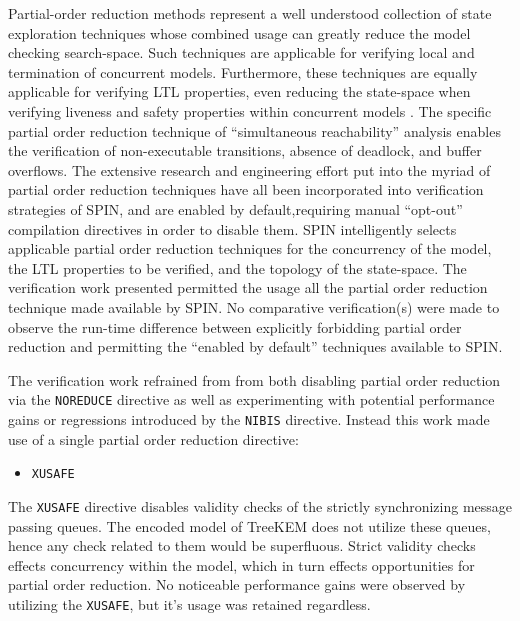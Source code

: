 Partial-order reduction methods represent a well understood collection of state exploration techniques \autocite{godefroid1990using, godefroid1991using, godefroid1994partial, holzmann1995improvement, katz1992verification, peled1993all, valmari1989stubborn, valmari1992stubborn} whose combined usage can greatly reduce the model checking search-space.
Such techniques are applicable for verifying local and termination of concurrent models.
Furthermore, these techniques are equally applicable for verifying LTL properties, even reducing the state-space when verifying liveness and safety properties within concurrent models \autocite{wolper1983reasoning}.
The specific partial order reduction technique of ``simultaneous reachability'' analysis \autocite{van1997partial} enables the verification of non-executable transitions, absence of deadlock, and buffer overflows.
The extensive research and engineering effort put into the myriad of partial order reduction techniques have all been incorporated into verification strategies of SPIN, and are enabled by default,requiring manual ``opt-out'' compilation directives in order to disable them.
SPIN intelligently selects applicable partial order reduction techniques for the concurrency of the model, the LTL properties to be verified, and the topology of the state-space.
The verification work presented permitted the usage all the partial order reduction technique made available by SPIN.\@
No comparative verification(s) were made to observe the run-time difference between explicitly forbidding partial order reduction and permitting the ``enabled by default'' techniques available to SPIN.\@

The verification work refrained from from both disabling partial order reduction via the \texttt{NOREDUCE} directive as well as experimenting with potential performance gains or regressions introduced by the \texttt{NIBIS} directive.
Instead this work made use of a single partial order reduction directive:

\begin{itemize}
\item \texttt{XUSAFE}
\end{itemize}

The \texttt{XUSAFE} directive disables validity checks of the strictly synchronizing message passing queues.
The encoded model of TreeKEM does not utilize these queues, hence any check related to them would be superfluous.
Strict validity checks effects concurrency within the model, which in turn effects opportunities for partial order reduction.
No noticeable performance gains were observed by utilizing the \texttt{XUSAFE}, but it's usage was retained regardless.


